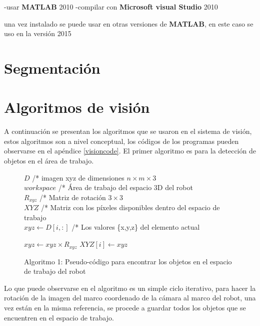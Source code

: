     -usar \textbf{MATLAB} 2010
    -compilar con \textbf{Microsoft visual Studio} 2010
    
    
    una vez instalado se puede usar en otras versiones de \textbf{MATLAB}, en este caso se uso en la versión 2015
    
    
    \section{Segmentación}
    
    
    
    
    
    
    
    
    
    
    
    
    
    
    
    
    
    
    
    
    
    
    
    
    
    
    
    \section{Algoritmos de visión}
    A continuación se presentan los algoritmos que se usaron en el sistema de visión, estos algoritmos son a nivel conceptual, los códigos de los programas pueden observarse en el apéndice \ref{visioncode}. El primer algoritmo es para la detección de objetos en el área de trabajo.
    \begin{figure}[h]
    	\centering
    	\begin{algorithmic}
    		\REQUIRE $ D $ /* imagen xyz de dimensiones $n \times m \times 3$ \\
    		
    		
    			\REQUIRE $ workspace $ /* Área de trabajo del espacio 3D del robot \\
    			
    			
    			\REQUIRE $ R_{xyz} $ /* Matriz de rotación $3\times 3$ \\
    			
    			
    			\ENSURE $XYZ$ /* Matriz con los píxeles disponibles dentro del espacio de trabajo\\
    		\STATE $xyz \leftarrow  D[i,:]$ /* Los valores \{x,y,z\} del elemento actual
    		
    		\STATE $xyz \leftarrow xyz \times R_{xyz}$
    		\STATE $XYZ[i] \leftarrow xyz$
    		\ENDIF
    		\ENDFOR
    	\end{algorithmic}
    	\caption{Algoritmo 1: Pseudo-código para encontrar los objetos en el espacio de trabajo del robot}
    	\label{alg1}
    \end{figure} 
    Lo que puede observarse en el algoritmo es un simple ciclo iterativo, para hacer la rotación de la imagen del marco coordenado de la cámara al marco del robot, una vez están en la misma referencia, se procede a guardar todos los objetos que se encuentren en el espacio de trabajo.
    
